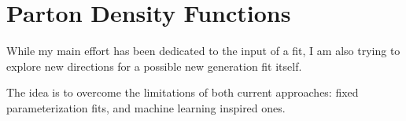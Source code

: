 \section{Parton Density Functions}

While my main effort has been dedicated to the input of a \pdf fit, I am also
trying to explore new directions for a possible new generation fit itself.

The idea is to overcome the limitations of both current approaches: fixed
parameterization fits, and machine learning inspired ones.

